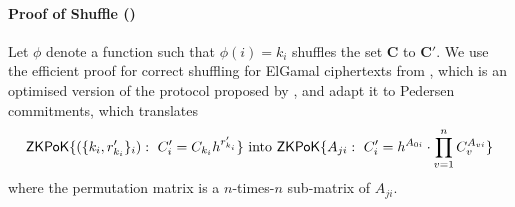 \paragraph{Proof of Shuffle (\PoS)}
Let $\phi$ denote a function such that $\phi(i)=k_i$ shuffles the set $\bm C$ to $\bm C'$.
We use the efficient proof for correct shuffling for ElGamal ciphertexts from \citet{Furukawa05}, which is an optimised version of the protocol proposed by \citet{FurukawaS01}, and adapt it to Pedersen commitments, which translates
\[
  \mathsf{ZKPoK}\{(\{k_i, r'_{k_i}\}_{i}) : ~ C'_{i}=C_{k_i}h^{r'_{k_i}}\}
\text{ into }
  \mathsf{ZKPoK}\{A_{ji}:~ C'_i=h^{A_{0i}}\cdot\prod_{v=1}^n C_v^{A_{vi}}\}
\]
where the permutation matrix is a $n$-times-$n$ sub-matrix of $A_{ji}$.


